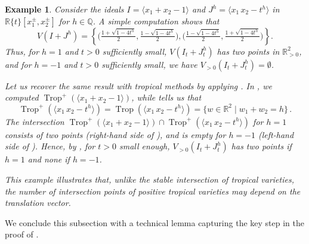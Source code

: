\documentclass[11pt,reqno,a4paper]{amsart}
\numberwithin{equation}{section}
\theoremstyle{theoremstyle}
\theoremstyle{examplestyle}
\newtheorem{example}[theorem]{Example}
\newcommand{\RR}{\mathbb{R}}
\newcommand{\QQ}{\mathbb{Q}}
\DeclareMathOperator{\Trop}{Trop}
\begin{document}
\begin{example}
    Consider the ideals $I = \langle x_1+x_2-1\rangle$ and $J^h = \langle x_1\, x_2 - t^h \rangle$ in $\mathbb{R}\{t\}[x_1^\pm,x_2^\pm]$ for $h\in \QQ$. A simple computation shows that
    \[ V(I+J^h) = \left\{ \Big(\tfrac{1 + \sqrt{1-4t^h} }{2},\tfrac{1 - \sqrt{1-4t^h} }{2}\Big),\Big(\tfrac{1 - \sqrt{1-4t^h} }{2},\tfrac{1 + \sqrt{1-4t^h} }{2}\Big) \right\}.\] 
    Thus, for $h = 1$ and $t > 0$ sufficiently small, $V(I_t+J^h_t)$ has two points in $\mathbb{R}_{>0}^2$,  and for $h = -1$ and $t > 0$ sufficiently small, we have $V_{>0}(I_t+J^{h}_t) = \emptyset$.

Let us recover the same result with tropical methods by applying . 
In , we computed $\Trop^+(\langle x_1+x_2-1\rangle)$, while  
 tells us that 
\[ \Trop^+( \langle x_1\, x_2 - t^h \rangle)=\Trop(\langle x_1\, x_2 - t^h \rangle) =\{w\in \RR^2 \mid w_1+w_2=h\}\,.\]
The intersection $\Trop^+(\langle x_1+x_2-1\rangle) \cap \Trop^+( \langle x_1\, x_2 - t^h\rangle)$ for $h=1$ consists of two points (right-hand side of ), and is empty for $h=-1$ (left-hand side of ). 
Hence, by ,  for $t>0$ small enough, $V_{>0}(I_t+J^h_t)$ has two points if $h=1$ and none if $h=-1$. 

This example illustrates that, unlike the stable intersection of tropical varieties, the number of intersection points of positive tropical varieties may depend on the translation vector.
\end{example}

We conclude this subsection with a technical lemma capturing the key step in the proof of .
\end{document}
